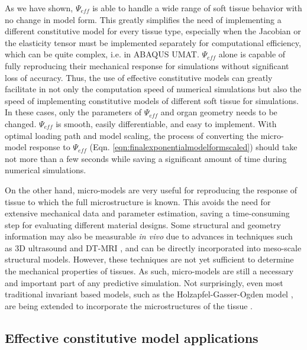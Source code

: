     
    As we have shown, $\Psi_{eff}$ is able to handle a wide range of soft tissue behavior with no change in model form. This greatly simplifies the need of implementing a different constitutive model for every tissue type, especially when the Jacobian or the elasticity tensor must be implemented separately for computational efficiency, which can be quite complex, i.e. in ABAQUS UMAT. $\Psi_{eff}$ alone is capable of fully reproducing their mechanical response for simulations without significant loss of accuracy. Thus, the use of effective constitutive models can greatly facilitate in not only the computation speed of numerical simulations but also the speed of implementing constitutive models of different soft tissue for simulations. In these cases, only the parameters of $\Psi_{eff}$ and organ geometry needs to be changed. $\Psi_{eff}$ is smooth, easily differentiable, and easy to implement. With optimal loading path and model scaling, the process of converting the micro-model response to $\Psi_{eff}$ (Eqn. \ref{eqn:finalexponentialmodelformscaled}) should take not more than a few seconds while saving a significant amount of time during numerical simulations. 
    
    
    On the other hand, micro-models are very useful for reproducing the response of tissue to which the full microstructure is known. This avoids the need for extensive mechanical data and parameter estimation, saving a time-consuming step for evaluating different material designs. Some structural and geometry information may also be measurable \textit{in vivo} due to advances in techniques such as 3D ultrasound \cite{steiner_diagnostic_1994, yang_3d_2008, fenster_3_1996} and DT-MRI \cite{basser_vivo_2000, basser_microstructural_2011}, and can be directly incorporated into meso-scale structural models. However, these techniques are not yet sufficient to determine the mechanical properties of tissues. As such, micro-models are still a necessary and important part of any predictive simulation. Not surprisingly, even most traditional invariant based models, such as the Holzapfel-Gasser-Ogden model \cite{holzapfel_new_2000}, are being extended to incorporate the microstructures of the tissue \cite{holzapfel_modelling_2015}. 
    
    

\subsection{Effective constitutive model applications}

